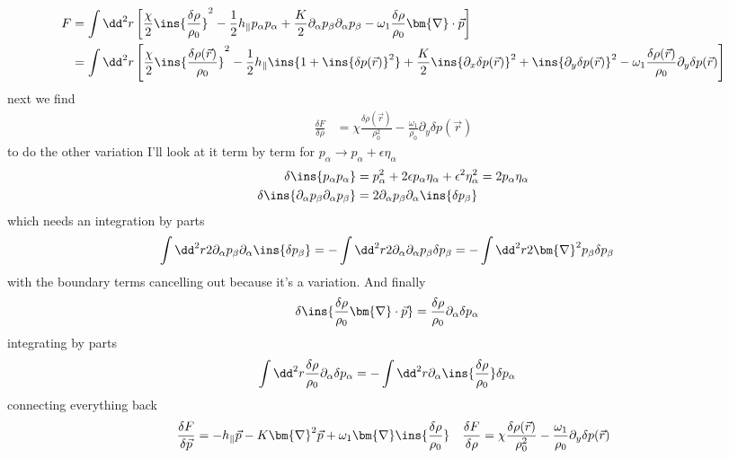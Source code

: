 \begin{align}
	F &= \int \dd^2 r \left[\frac{\chi}{2}\ins{\frac{\delta\rho}{\rho_0}}^2-\frac{1}{2}h_\parallel p_\alpha p_\alpha + \frac{K}{2}\partial_\alpha p_\beta \partial_\alpha p_\beta - \omega_1\frac{\delta\rho}{\rho_0}\bm{\nabla}\cdot\vec{p}\right] \\
	&= \int \dd^2 r \left[\frac{\chi}{2}\ins{\frac{\delta\rho(\vec{r})}{\rho_0}}^2-\frac{1}{2}h_\parallel \ins{1+\ins{\delta p(\vec{r})}^2} + \frac{K}{2}\ins{\partial_x \delta p(\vec{r})}^2 + \ins{\partial_y \delta p(\vec{r})}^2 - \omega_1\frac{\delta\rho(\vec{r})}{\rho_0}\partial_y \delta p(\vec{r})\right]
\end{align}
next we find
\begin{align}
	\frac{\delta F}{\delta\rho} &= \chi\frac{\delta\rho(\vec{r})}{\rho_0^2} - \frac{\omega_1}{\rho_0}\partial_y\delta p(\vec{r})
\end{align}
to do the other variation I'll look at it term by term for \(p_\alpha \rightarrow p_\alpha + \epsilon\eta_\alpha\)
\begin{align}
	\delta\ins{p_\alpha p_\alpha} &= p_\alpha^2+2\epsilon p_\alpha \eta_\alpha + \epsilon^2\eta_\alpha^2 = 2p_\alpha\eta_\alpha \\
	\delta\ins{\partial_\alpha p_\beta \partial_\alpha p_\beta} &= 2\partial_\alpha p_\beta \partial_\alpha \ins{\delta p_\beta}
\end{align}
which needs an integration by parts
\begin{align}
	\int\dd^2 r 2\partial_\alpha p_\beta \partial_\alpha \ins{\delta p_\beta} &= -\int\dd^2 r 2\partial_\alpha\partial_\alpha p_\beta \delta p_\beta = -\int\dd^2 r 2\bm{\nabla}^2 p_\beta \delta p_\beta
\end{align}
with the boundary terms cancelling out because it's a variation. And finally
\begin{align}
	\delta\ins{\frac{\delta\rho}{\rho_0}\bm{\nabla}\cdot\vec{p}} &= \frac{\delta\rho}{\rho_0}\partial_\alpha\delta p_\alpha
\end{align}
integrating by parts
\begin{align}
	\int\dd^2 r \frac{\delta\rho}{\rho_0}\partial_\alpha\delta p_\alpha &= -\int\dd^2 r \partial_\alpha\ins{\frac{\delta\rho}{\rho_0}}\delta p_\alpha
\end{align}
connecting everything back
\begin{align}
	\frac{\delta F}{\delta \vec{p}} = -h_\parallel \vec{p} - K\bm{\nabla}^2 \vec{p} + \omega_1\bm{\nabla}\ins{\frac{\delta\rho}{\rho_0}} && \frac{\delta F}{\delta\rho} = \chi\frac{\delta\rho(\vec{r})}{\rho_0^2} - \frac{\omega_1}{\rho_0}\partial_y\delta p(\vec{r})
\end{align}
